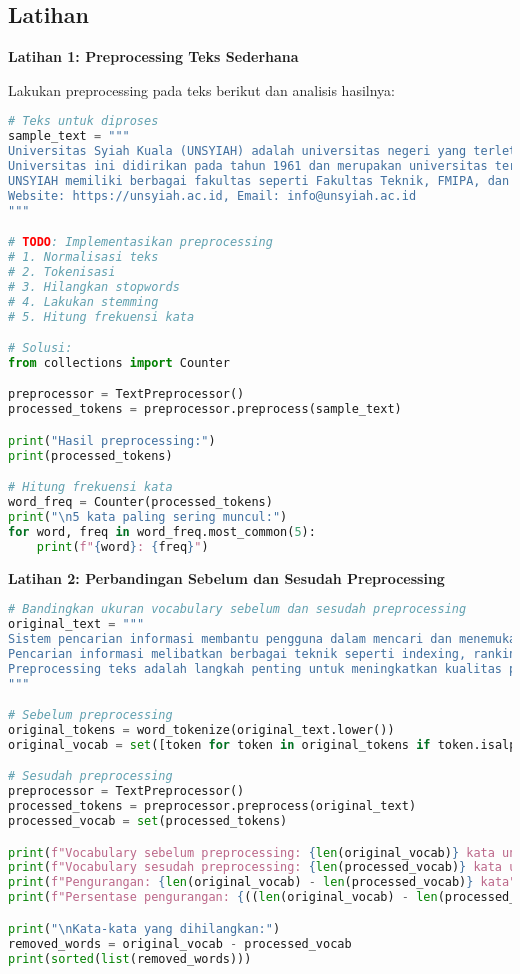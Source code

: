 \subsection*{Latihan}

\textbf{Latihan 1: Preprocessing Teks Sederhana}

Lakukan preprocessing pada teks berikut dan analisis hasilnya:

\begin{lstlisting}[language=python, style=python]
# Teks untuk diproses
sample_text = """
Universitas Syiah Kuala (UNSYIAH) adalah universitas negeri yang terletak di Banda Aceh, Aceh.
Universitas ini didirikan pada tahun 1961 dan merupakan universitas tertua di Aceh.
UNSYIAH memiliki berbagai fakultas seperti Fakultas Teknik, FMIPA, dan Fakultas Kedokteran.
Website: https://unsyiah.ac.id, Email: info@unsyiah.ac.id
"""

# TODO: Implementasikan preprocessing
# 1. Normalisasi teks
# 2. Tokenisasi
# 3. Hilangkan stopwords
# 4. Lakukan stemming
# 5. Hitung frekuensi kata

# Solusi:
from collections import Counter

preprocessor = TextPreprocessor()
processed_tokens = preprocessor.preprocess(sample_text)

print("Hasil preprocessing:")
print(processed_tokens)

# Hitung frekuensi kata
word_freq = Counter(processed_tokens)
print("\n5 kata paling sering muncul:")
for word, freq in word_freq.most_common(5):
    print(f"{word}: {freq}")
\end{lstlisting}

\textbf{Latihan 2: Perbandingan Sebelum dan Sesudah Preprocessing}

\begin{lstlisting}[language=python, style=python]
# Bandingkan ukuran vocabulary sebelum dan sesudah preprocessing
original_text = """
Sistem pencarian informasi membantu pengguna dalam mencari dan menemukan informasi yang relevan.
Pencarian informasi melibatkan berbagai teknik seperti indexing, ranking, dan retrieval.
Preprocessing teks adalah langkah penting untuk meningkatkan kualitas pencarian informasi.
"""

# Sebelum preprocessing
original_tokens = word_tokenize(original_text.lower())
original_vocab = set([token for token in original_tokens if token.isalpha()])

# Sesudah preprocessing
preprocessor = TextPreprocessor()
processed_tokens = preprocessor.preprocess(original_text)
processed_vocab = set(processed_tokens)

print(f"Vocabulary sebelum preprocessing: {len(original_vocab)} kata unik")
print(f"Vocabulary sesudah preprocessing: {len(processed_vocab)} kata unik")
print(f"Pengurangan: {len(original_vocab) - len(processed_vocab)} kata")
print(f"Persentase pengurangan: {((len(original_vocab) - len(processed_vocab)) / len(original_vocab)) * 100:.1f}%")

print("\nKata-kata yang dihilangkan:")
removed_words = original_vocab - processed_vocab
print(sorted(list(removed_words)))
\end{lstlisting}

